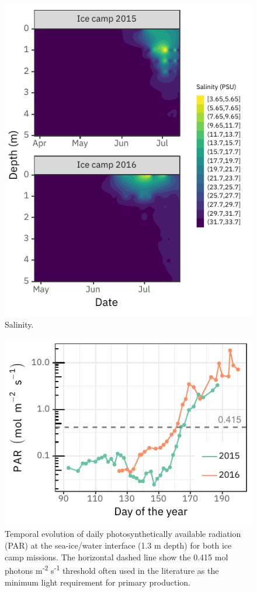 \documentclass[12pt,a4paper]{scrartcl}
\begin{document}
\clearpage
\newpage

\begin{figure}[h]
	\centering
	\includegraphics[scale = 2]{../../../graphs/fig3.pdf}
	\caption{Salinity.}
\end{figure}

\begin{figure}[h]
	\centering
	\includegraphics[scale = 2]{../../../graphs/fig4.pdf}
	\caption{Temporal evolution of daily photosynthetically available radiation (PAR) at the sea-ice/water interface (1.3 m depth) for both ice camp missions. The horizontal dashed line show the 0.415 mol photons m\textsuperscript{-2} s\textsuperscript{-1} threshold often used in the literature as the minimum light requirement for primary production.}
\end{figure}
\end{document}
